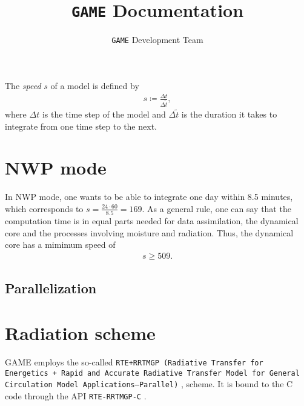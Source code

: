 \documentclass{article}
\title{\texttt{GAME} Documentation}
\author{\texttt{GAME} Development Team}
\date{}
\begin{document}
\maketitle

The \textit{speed} $s$ of a model is defined by
%
\begin{eqnarray}
s \coloneqq \frac{\Delta t}{\Delta\tilde{t}},
\end{eqnarray}
%
where $\Delta t$ is the time step of the model and $\Delta\tilde{t}$ is the duration it takes to integrate from one time step to the next.

\section{NWP mode}
\label{sec:nwp_mode}

In NWP mode, one wants to be able to integrate one day within 8.5 minutes, which corresponds to $s = \frac{24\cdot 60}{8.5} = 169$. As a general rule, one can say that the computation time is in equal parts needed for data assimilation, the dynamical core and the processes involving moisture and radiation. Thus, the dynamical core has a mimimum speed of
%
\begin{eqnarray}
s \geq 509.
\end{eqnarray}

\subsection{Parallelization}
\label{sec:parallelization}

\section{Radiation scheme}
\label{sec:radiation_scheme}

GAME employs the so-called \texttt{RTE+RRTMGP (Radiative Transfer for Energetics + Rapid and Accurate Radiative Transfer Model for General Circulation Model Applications—Parallel)} \cite{doi:10.1029/2019MS001621}, \cite{rte-rrtmgp-github} scheme. It is bound to the C code through the API \texttt{RTE-RRTMGP-C} \cite{rte-rrtmgp-c-github}.

\appendix

\printbibliography
\end{document}
